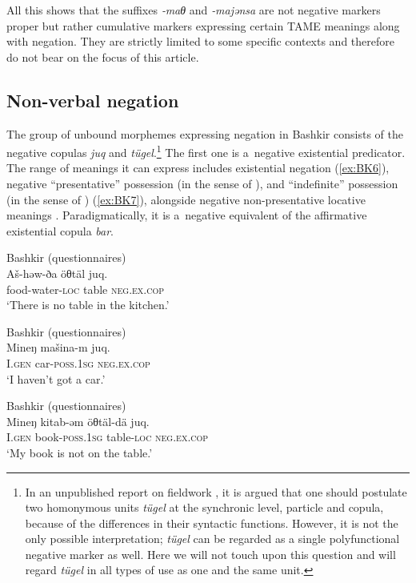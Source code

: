 \documentclass[output=paper,draft,draftmode,colorlinks,citecolor=brown]{langscibook}
\begin{document}
All this shows that the suffixes \textit{‑maθ} and \textit{‑majənsa} are not negative markers proper but rather cumulative markers expressing certain TAME meanings along with negation. They are strictly limited to some specific contexts and therefore do not bear on the focus of this article.

\subsection{Non-verbal negation}\label{sec:BK2.2}

The group of unbound morphemes expressing negation in Bashkir consists of the negative copulas \textit{juq} and \textit{tügel}.\footnote{In an unpublished report on fieldwork \citep{mishchenko2011a}, it is argued that one should postulate two homonymous units \textit{tügel} at the synchronic level, particle and copula, because of the differences in their syntactic functions. However, it is not the only possible interpretation; \textit{tügel} can be regarded as a single polyfunctional negative marker as well. Here we will not touch upon this question and will regard \textit{tügel} in all types of use as one and the same unit.} The first one is a negative existential predicator. The range of meanings it can express includes existential negation (\ref{ex:BK6}), negative “presentative” possession (in the sense of \citealp{hengeveld1992a}), and “indefinite” possession (in the sense of \citealp{stassen2009a}) (\ref{ex:BK7}), alongside negative non-presentative locative meanings . Paradigmatically, it is a negative equivalent of the affirmative existential copula \textit{bar}.

\ea Bashkir (questionnaires) \label{ex:BK6}\\
	\gll Aš-həw-ða			öθtäl		juq.\\
	food-water-\textsc{loc}	table		\textsc{neg.ex.cop}\\
	\glt `There is no table in the kitchen.'
\z

\ea Bashkir (questionnaires) \label{ex:BK7}\\
	\gll Mineŋ		mašina-m	juq.\\
	I.\textsc{gen}		car-\textsc{poss.1sg}	\textsc{neg.ex.cop}\\
	\glt `I haven’t got a car.'
\z

\ea Bashkir (questionnaires) \label{ex:BK8}\\
	\gll Mineŋ		kitab-əm		öθtäl-dä		juq.\\
	I.\textsc{gen}		book-\textsc{poss.1sg}	table-\textsc{loc}	\textsc{neg.ex.cop}\\
	\glt `My book is not on the table.'
\z
\end{document}
